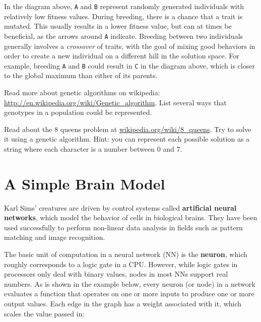 \documentclass[10pt]{book}
\begin{document}
In the diagram above, {\tt A} and {\tt B} represent randomly generated
individuals with relatively low fitness values. During breeding, there is a
chance that a trait is mutated. This usually results in a lower fitness value,
but can at times be beneficial, as the arrows around {\tt A}
indicate. Breeding between two individuals
generally involves a {\em crossover} of traits, 
with the goal of mixing good behaviors in order to create a new individual 
on a different hill in the solution space. For example, breeding {\tt A} 
and {\tt B} could result in {\tt C} in the diagram above, which is closer 
to the global maximum than either of its parents.
 
\begin{ex}
  Read more about genetic algorithms on wikipedia: 
  \url{http://en.wikipedia.org/wiki/Genetic_algorithm}. List several ways that 
  genotypes in a population could be represented.
\end{ex}

\begin{ex}
  Read about the 8 queens problem at \url{wikipedia.org/wiki/8_queens}.
  Try to solve it using a genetic algorithm. Hint: you can represent
  each possible solution as a string where each character is a number
  between 0 and 7.
\end{ex}

\section{A Simple Brain Model}

Karl Sims' creatures are driven by control systems called {\bf artificial neural
networks}, which model the behavior of cells in biological brains. They 
have been used successfully to perform non-linear data analysis in fields such as
pattern matching and image recognition.

The basic unit of computation in a neural network (NN) is the {\bf neuron}, which
roughly corresponds to a logic gate in a CPU. However, while logic gates in 
processors only deal with binary values, nodes in most NNs support real numbers.
As is shown in the example below, every neuron (or node) in a network evaluates a 
function that operates on one or more inputs to produce one or more output values. 
Each edge in the graph has a weight associated with it, which scales the value passed in: %
\end{document}
